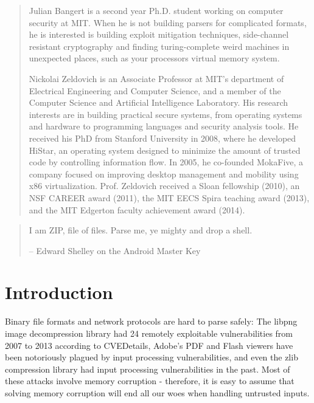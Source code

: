 \begin{quote}
Julian Bangert is a second year Ph.D. student working on computer security at MIT. When he is not
building parsers for complicated formats, he is interested is building exploit mitigation
techniques, side-channel resistant cryptography and finding turing-complete weird machines in
unexpected places, such as your processors virtual memory system.

Nickolai Zeldovich is an Associate Professor at MIT's department of Electrical Engineering and Computer Science, and a member of the Computer Science and Artificial Intelligence Laboratory. His research interests are in building practical secure systems, from operating systems and hardware to programming languages and security analysis tools. He received his PhD from Stanford University in 2008, where he developed HiStar, an operating system designed to minimize the amount of trusted code by controlling information flow. In 2005, he co-founded MokaFive, a company focused on improving desktop management and mobility using x86 virtualization. Prof. Zeldovich received a Sloan fellowship (2010), an NSF CAREER award (2011), the MIT EECS Spira teaching award (2013), and the MIT Edgerton faculty achievement award (2014).
\end{quote}
\begin{quote}
  I am ZIP, file of files.
  Parse me, ye mighty and drop a shell.

  -- Edward Shelley on the Android Master Key
\end{quote}
\section{Introduction}
Binary file formats and network protocols are hard to parse safely: 
The libpng image decompression library had 24 remotely
exploitable vulnerabilities from 2007 to 2013 according to CVEDetails,
Adobe's PDF and Flash viewers have been notoriously plagued by input
processing vulnerabilities, and even the zlib compression library had
input processing vulnerabilities in the past.
Most of these attacks involve memory corruption - therefore, it is easy to assume that 
solving memory corruption will end all our woes when handling untrusted inputs. 

